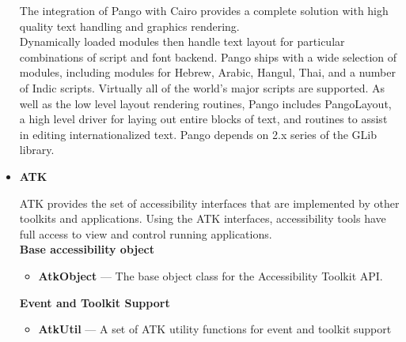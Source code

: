 \documentclass[12pt]{article}
\begin{document}
\begin{itemize}
\begin{itemize}
\end{itemize}

The integration of Pango with Cairo provides a complete solution with high quality text handling and graphics rendering.\\

Dynamically loaded modules then handle text layout for particular combinations of script and font backend. Pango ships with a wide selection of modules, including modules for Hebrew, Arabic, Hangul, Thai, and a number of Indic scripts. Virtually all of the world's major scripts are supported. As well as the low level layout rendering routines, Pango includes PangoLayout, a high level driver for laying out entire blocks of text, and routines to assist in editing internationalized text.
Pango depends on 2.x series of the GLib library.

\item \textbf{ATK}

ATK provides the set of accessibility interfaces that are implemented by other toolkits and applications. Using the ATK interfaces, accessibility tools have full access to view and control running applications.\\

\textbf{Base accessibility object}
\begin{itemize}
\item \textbf{AtkObject} — The base object class for the Accessibility Toolkit API.
\end{itemize}

\textbf{Event and Toolkit Support}
\begin{itemize}
\item \textbf{AtkUtil} — A set of ATK utility functions for event and toolkit support
\end{itemize}


\end{itemize}
\end{document}
